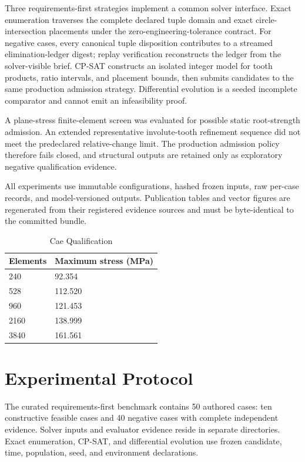 \documentclass[preprint,12pt]{elsarticle}
\begin{document}
Three requirements-first strategies implement a common solver interface. Exact enumeration traverses the complete declared tuple domain and exact circle-intersection placements under the zero-engineering-tolerance contract. For negative cases, every canonical tuple disposition contributes to a streamed elimination-ledger digest; replay verification reconstructs the ledger from the solver-visible brief. CP-SAT constructs an isolated integer model for tooth products, ratio intervals, and placement bounds, then submits candidates to the same production admission strategy. Differential evolution is a seeded incomplete comparator and cannot emit an infeasibility proof.

A plane-stress finite-element screen was evaluated for possible static root-strength admission. An extended representative involute-tooth refinement sequence did not meet the predeclared relative-change limit. The production admission policy therefore fails closed, and structural outputs are retained only as exploratory negative qualification evidence.

All experiments use immutable configurations, hashed frozen inputs, raw per-case records, and model-versioned outputs. Publication tables and vector figures are regenerated from their registered evidence sources and must be byte-identical to the committed bundle.

\begin{table}[htbp]
\centering
\caption{Cae Qualification}
\small
\begin{tabular}{ll}
\textbf{Elements} & \textbf{Maximum stress (MPa)} \\
\hline
240 & 92.354 \\
528 & 112.520 \\
960 & 121.453 \\
2160 & 138.999 \\
3840 & 161.561 \\
\end{tabular}
\end{table}
\section{Experimental Protocol}
The curated requirements-first benchmark contains 50 authored cases: ten constructive feasible cases and 40 negative cases with complete independent evidence. Solver inputs and evaluator evidence reside in separate directories. Exact enumeration, CP-SAT, and differential evolution use frozen candidate, time, population, seed, and environment declarations.
\end{document}

